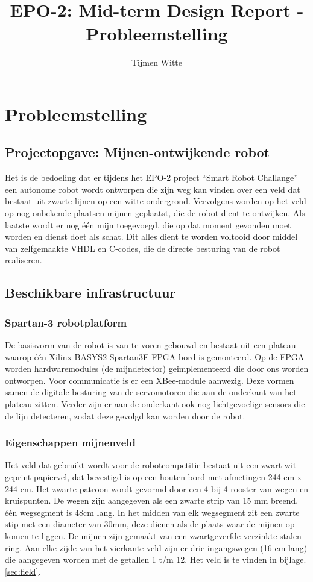 \documentclass{report}
\title{EPO-2: Mid-term Design Report - Probleemstelling}
\author{Tijmen Witte}
\begin{document}
\chapter{Probleemstelling}
\label{ch:probleem}

\section{Projectopgave: Mijnen-ontwijkende robot}

Het is de bedoeling dat er tijdens het EPO-2 project “Smart Robot Challange” een autonome robot wordt ontworpen die zijn weg kan vinden over een veld dat bestaat uit zwarte lijnen op een witte ondergrond. Vervolgens worden op het veld op nog onbekende plaatsen mijnen geplaatst, die de robot dient te ontwijken. Als laatste wordt er nog één mijn toegevoegd, die op dat moment gevonden moet worden en dienst doet als schat. Dit alles dient te worden voltooid door middel van zelfgemaakte VHDL en C-codes, die de directe besturing van de robot realiseren. 

\section{Beschikbare infrastructuur}
\subsection{Spartan-3 robotplatform}

De basisvorm van de robot is van te voren gebouwd en bestaat uit een plateau waarop één Xilinx BASYS2 Spartan3E FPGA-bord is gemonteerd. Op de FPGA worden hardwaremodules (de mijndetector) geimplementeerd die door ons worden ontworpen. Voor communicatie is er een XBee-module aanwezig. Deze vormen samen de digitale besturing van de servomotoren die aan de onderkant van het plateau zitten. Verder zijn er aan de onderkant ook nog lichtgevoelige sensors die de lijn detecteren, zodat deze gevolgd kan worden door de robot. 

\subsection{Eigenschappen mijnenveld}

Het veld dat gebruikt wordt voor de robotcompetitie bestaat uit een zwart-wit geprint papiervel, dat bevestigd is op een houten bord met afmetingen 244 cm x 244 cm. Het zwarte patroon wordt gevormd door een 4 bij 4 rooster van wegen en kruispunten. De wegen zijn aangegeven als een zwarte strip van 15 mm breend, één wegsegment is 48cm lang. In het midden van elk wegsegment zit een zwarte stip met een diameter van 30mm, deze dienen als de plaats waar de mijnen op komen te liggen. De mijnen zijn gemaakt van een zwartgeverfde verzinkte stalen ring. Aan elke zijde van het vierkante veld zijn er drie ingangswegen (16 cm lang) die aangegeven worden met de getallen 1 t/m 12. Het veld is te vinden in bijlage. \ref{sec:field}.
\end{document}
